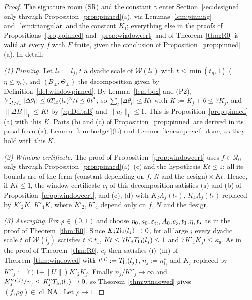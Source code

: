 \documentclass[10pt]{amsart}
\theoremstyle{definition}
\theoremstyle{remark}
\newcommand{\NA}{\operatorname{NA}}
\newcommand{\cl}{\operatorname{cl}}
\begin{document}
\begin{proof}
The signature room (SR) and the constant $\gamma$ enter
Section~\ref{sec:designed} only through Proposition~\ref{prop:pinned}(a),
via Lemmas~\ref{lem:pinning} and~\ref{lem:triangular} and the constant
$K_1$; everything else in the proofs of Propositions~\ref{prop:pinned}
and~\ref{prop:windowcert} and of Theorem~\ref{thm:R0} is valid at every
$f$ with $F$ finite, given the conclusion of
Proposition~\ref{prop:pinned}(a).  In detail:

\emph{(1) Pinning.}  Let $l_*:=l_j$, $t$ a dyadic scale of
$\mathcal W(l_*)$ with $t\le\min(t_\eta,1)$ ($\eta\le\eta_*$), and
$(B_\pm,\Theta_\pm)$ the decomposition given by
Definition~\ref{def:windowpinned}.  By Lemma~\ref{lem:box} and (P2),
$\sum_{l>l_*}|\Delta\theta_l|\le6T_{\rm lo}(l_*)^3/t\le6t^2$, so
$\sum_l|\Delta\theta_l|\le Kt$ with $K:=K_j+6\le7K_j$, and
$\|\Delta B\|_1\le Kt$ by \eqref{eq:DeltaB} and $\|u_l\|_1\le1$.  This is
Proposition~\ref{prop:pinned}(a) with this $K$.  Parts (b) and (c) of
Proposition~\ref{prop:pinned} are derived in its proof from (a),
Lemma~\ref{lem:budget}(b) and Lemma~\ref{lem:suplevel} alone, so they hold
with this $K$.

\emph{(2) Window certificate.}  The proof of
Proposition~\ref{prop:windowcert} uses $f\in\mathcal R_0$ only through
Proposition~\ref{prop:pinned}(a)--(c) and the hypothesis $Kt\le1$; all its
bounds are of the form (constant depending on $f$, $N$ and the
design)${}\times Kt$.  Hence, if $Kt\le1$, the window certificate $c_t$ of
this decomposition satisfies (a) and (b) of
Proposition~\ref{prop:windowcert}, and (c), (d) with $K_2\Lambda_f(l_*)$,
$K_4\Lambda_f(l_*)$ replaced by $K'_2K$, $K'_4K$, where $K'_2,K'_4$ depend
only on $f$, $N$ and the design.

\emph{(3) Averaging.}  Fix $\rho\in(0,1)$ and choose $\eta_0,\kappa_0,
\varepsilon_{\rm tr},A_0,c_\flat,t_1,\eta,t_\star$ as in the proof of
Theorem~\ref{thm:R0}.  Since $K_jT_{\rm hi}(l_j)\to0$, for all large $j$
every dyadic scale $t$ of $\mathcal W(l_j)$ satisfies $t\le t_\star$,
$Kt\le7K_jT_{\rm hi}(l_j)\le1$ and $7K'_4K_jt\le\kappa_0$.  As in the proof
of Theorem~\ref{thm:R0}, $c_t$ then satisfies (i)--(iii) of
Theorem~\ref{thm:windowed} with $t^{(j)}:=T_{\rm hi}(l_j)$,
$n_j:=n^w_{l_j}$ and $K_j$ replaced by $K''_j:=7(1+\|U\|)K'_2K_j$.  Finally
$n_j/K''_j\to\infty$ and $K''_jt^{(j)}/n_j\le K''_jT_{\rm hi}(l_j)\to0$, so
Theorem~\ref{thm:windowed} gives $(f,\rho g)\in\cl\NA$.  Let $\rho\to1$.
\end{proof}
\end{document}
